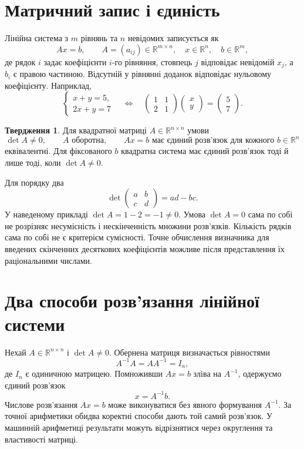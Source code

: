 \documentclass[11pt,a4paper]{article}
\theoremstyle{definition}
\newtheorem{proposition}[definition]{Твердження}
\begin{document}
\section{Матричний запис і єдиність}
Лінійна система з $m$ рівнянь та $n$ невідомих записується як
\[
Ax=b,\qquad A=(a_{ij})\in\mathbb R^{m\times n},\quad
x\in\mathbb R^n,\quad b\in\mathbb R^m,
\]
де рядок $i$ задає коефіцієнти $i$-го рівняння, стовпець $j$
відповідає невідомій $x_j$, а $b_i$ є правою частиною.
Відсутній у рівнянні доданок відповідає нульовому коефіцієнту.
Наприклад,
\[
\begin{cases}x+y=5,\\2x+y=7\end{cases}
\quad\Longleftrightarrow\quad
\begin{pmatrix}1&1\\2&1\end{pmatrix}
\begin{pmatrix}x\\y\end{pmatrix}
=\begin{pmatrix}5\\7\end{pmatrix}.
\]
\begin{proposition}
Для квадратної матриці $A\in\mathbb R^{n\times n}$ умови
\[
\det A\ne0,\qquad A\text{ оборотна},\qquad
Ax=b\text{ має єдиний розв'язок для кожного }b\in\mathbb R^n
\]
еквівалентні. Для фіксованого $b$ квадратна система має єдиний розв'язок
тоді й лише тоді, коли $\det A\ne0$.
\end{proposition}
Для порядку два
\[
\det\begin{pmatrix}a&b\\c&d\end{pmatrix}=ad-bc.
\]
У наведеному прикладі $\det A=1-2=-1\ne0$.
Умова $\det A=0$ сама по собі не розрізняє несумісність і нескінченність
множини розв'язків. Кількість рядків сама по собі не є критерієм сумісності.
Точне обчислення визначника для введених скінченних десяткових
коефіцієнтів можливе після представлення їх раціональними числами.

\section{Два способи розв’язання лінійної системи}
Нехай $A\in\mathbb R^{n\times n}$ і $\det A\ne0$.
Обернена матриця визначається рівностями
\[
A^{-1}A=AA^{-1}=I_n,
\]
де $I_n$ є одиничною матрицею. Помноживши $Ax=b$ зліва на $A^{-1}$,
одержуємо єдиний розв'язок
\[
x=A^{-1}b.
\]
Числове розв'язання $Ax=b$ може виконуватися без явного формування
$A^{-1}$. За точної арифметики обидва коректні способи дають той самий
розв'язок. У машинній арифметиці результати можуть відрізнятися через
округлення та властивості матриці.
\end{document}
